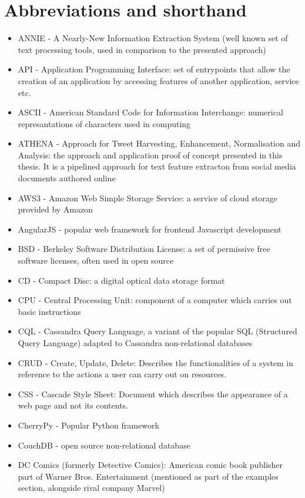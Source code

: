 \appendix
\chapter{Abbreviations and shorthand}

\begin{itemize}
\item ANNIE - A Nearly-New Information Extraction System (well known set of text processing tools, used in comparison to the presented approach)
\item API - Application Programming Interface: set of entrypoints that allow the creation of an application by accessing features of another application, service etc.
\item ASCII - American Standard Code for Information Interchange: numerical represantations of characters used in computing
\item ATHENA - Approach for Tweet Harvesting, Enhancement, Normalisation and Analysis: the approach and application proof of concept presented in this thesis. It is a pipelined approach for text feature extracton from social media documents authored online
\item AWS3 - Amazon Web Simple Storage Service: a service of cloud storage provided by Amazon
\item AngularJS - popular web framework for frontend Javascript development
\item BSD - Berkeley Software Distribution License: a set of permissive free software licenses, often used in open source
\item CD - Compact Disc: a digital optical data storage format
\item CPU - Central Processing Unit: component of a computer which carries out basic instructions
\item CQL - Cassandra Query Language, a variant of the popular SQL (Structured Query Language) adapted to Cassandra non-relational databases
\item CRUD - Create, Update, Delete: Describes the functionalities of a system in reference to the actions a user can carry out on resources.
\item CSS - Cascade Style Sheet: Document which describes the appearance of a web page and not its contents.
\item CherryPy - Popular Python framework
\item CouchDB - open source non-relational database
\item DC Comics (formerly Detective Comics): American comic book publisher part of Warner Bros. Entertainment (mentioned as part of the examples section, alongside rival company Marvel)

\end{itemize}
